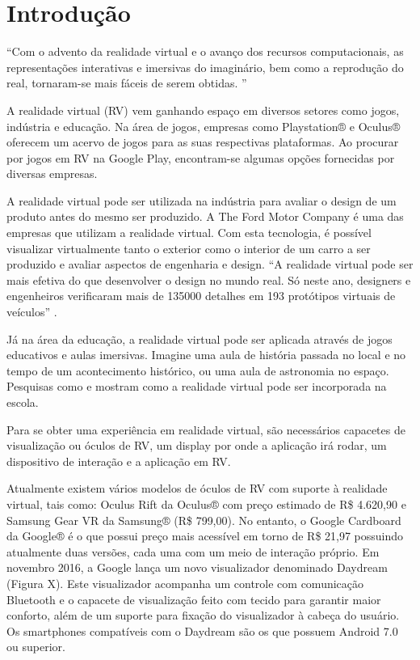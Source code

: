 \chapter{Introdução}
\label{c.introducao}

“Com o advento da realidade virtual e o avanço dos recursos computacionais, as representações interativas e imersivas do imaginário, bem como a reprodução do real, tornaram-se mais fáceis de serem obtidas. ” \cite[p. ~9]{torilivro}

A realidade virtual (RV) vem ganhando espaço em diversos setores como jogos, indústria e educação. Na área de jogos, empresas como Playstation® e Oculus® oferecem um acervo de jogos para as suas respectivas plataformas. Ao procurar por jogos em RV na Google Play, encontram-se algumas opções fornecidas por diversas empresas.

A realidade virtual pode ser utilizada na indústria para avaliar o design de um produto antes do mesmo ser produzido. A The Ford Motor Company é uma das empresas que utilizam a realidade virtual. Com esta tecnologia, é possível visualizar virtualmente tanto o exterior como o interior de um carro a ser produzido e avaliar aspectos de engenharia e design. “A realidade virtual pode ser mais efetiva do que desenvolver o design no mundo real. Só neste ano, designers e engenheiros verificaram mais de 135000 detalhes em 193 protótipos virtuais de veículos” \cite[tradução nossa]{ford}. 

Já na área da educação, a realidade virtual pode ser aplicada através de jogos educativos e aulas imersivas. Imagine uma aula de história passada no local e no tempo de um acontecimento histórico, ou uma aula de astronomia no espaço. Pesquisas como \cite{youngblut} e \cite{carvalho} mostram como a realidade virtual pode ser incorporada na escola.

Para se obter uma experiência em realidade virtual, são necessários capacetes de visualização ou óculos de RV, um display por onde a aplicação irá rodar, um dispositivo de interação e a aplicação em RV. 

Atualmente existem vários modelos de óculos de RV com suporte à realidade virtual, tais como: Oculus Rift da Oculus® com preço estimado de R\$ 4.620,90 e Samsung Gear VR da Samsung® (R\$ 799,00). No entanto, o Google Cardboard da Google® é o que possui preço mais acessível em torno de R\$ 21,97 possuindo atualmente duas versões, cada uma com um meio de interação próprio. Em novembro 2016, a Google lança um novo visualizador denominado Daydream (Figura X). Este visualizador acompanha um controle com comunicação Bluetooth e o capacete de visualização feito com tecido para garantir maior conforto, além de um suporte para fixação do visualizador à cabeça do usuário. Os smartphones compatíveis com o Daydream são os que possuem Android 7.0 ou superior.

